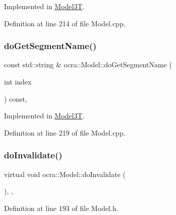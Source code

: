 Implemented in \hyperlink{classModel3T_aabe2edc629d42407da7b45db620854c2}{Model3T}.



Definition at line 214 of file Model.\+cpp.

\hypertarget{classocra_1_1Model_a0f339ce01a0871a19b0f952bdda82822}{}\label{classocra_1_1Model_a0f339ce01a0871a19b0f952bdda82822} 
\subsubsection{\texorpdfstring{do\+Get\+Segment\+Name()}{doGetSegmentName()}}
{\footnotesize\ttfamily const std\+::string \& ocra\+::\+Model\+::do\+Get\+Segment\+Name (\begin{DoxyParamCaption}\item[{int}]{index }\end{DoxyParamCaption}) const\hspace{0.3cm}{\ttfamily [protected]}, {}}



Implemented in \hyperlink{classModel3T_a1fbf30cc6c5a4abfcd9ecd574e79b866}{Model3T}.



Definition at line 219 of file Model.\+cpp.

\hypertarget{classocra_1_1Model_a902663196e1c7535c27b755cf4436693}{}\label{classocra_1_1Model_a902663196e1c7535c27b755cf4436693} 
\subsubsection{\texorpdfstring{do\+Invalidate()}{doInvalidate()}}
{\footnotesize\ttfamily virtual void ocra\+::\+Model\+::do\+Invalidate (\begin{DoxyParamCaption}{ }\end{DoxyParamCaption})\hspace{0.3cm}{\ttfamily [inline]}, {\ttfamily [protected]}, {\ttfamily [virtual]}}



Definition at line 193 of file Model.\+h.

\hypertarget{classocra_1_1Model_a887c6805af16d21ec54ef104f79f244d}{}\label{classocra_1_1Model_a887c6805af16d21ec54ef104f79f244d} 
